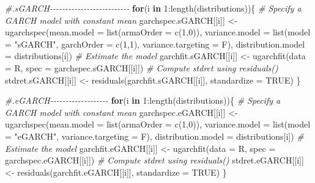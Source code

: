 \documentclass[a4paper, twoside]{templates/ociamthesis}
\newenvironment{Shaded}{\begin{snugshade}}{\end{snugshade}}
\newcommand{\AttributeTok}[1]{\textcolor[rgb]{0.77,0.63,0.00}{#1}}
\newcommand{\CommentTok}[1]{\textcolor[rgb]{0.56,0.35,0.01}{\textit{#1}}}
\newcommand{\ConstantTok}[1]{\textcolor[rgb]{0.00,0.00,0.00}{#1}}
\newcommand{\ControlFlowTok}[1]{\textcolor[rgb]{0.13,0.29,0.53}{\textbf{#1}}}
\newcommand{\DecValTok}[1]{\textcolor[rgb]{0.00,0.00,0.81}{#1}}
\newcommand{\FunctionTok}[1]{\textcolor[rgb]{0.00,0.00,0.00}{#1}}
\newcommand{\NormalTok}[1]{#1}
\newcommand{\OtherTok}[1]{\textcolor[rgb]{0.56,0.35,0.01}{#1}}
\newcommand{\SpecialCharTok}[1]{\textcolor[rgb]{0.00,0.00,0.00}{#1}}
\newcommand{\StringTok}[1]{\textcolor[rgb]{0.31,0.60,0.02}{#1}}
\renewenvironment{Shaded}
{
  \vspace{10pt}%
  \begin{snugshade}%
}{%
  \end{snugshade}%
  \vspace{8pt}%
}
\begin{document}
\begin{Shaded}
\begin{Highlighting}[]
\CommentTok{\#.sGARCH{-}{-}{-}{-}{-}{-}{-}{-}{-}{-}{-}{-}{-}{-}{-}{-}{-}{-}{-}{-}{-}{-}{-}{-}{-}{-}}
\ControlFlowTok{for}\NormalTok{(i }\ControlFlowTok{in} \DecValTok{1}\SpecialCharTok{:}\FunctionTok{length}\NormalTok{(distributions))\{}
\CommentTok{\# Specify a GARCH model with constant mean}
\NormalTok{garchspec.sGARCH[[i]] }\OtherTok{\textless{}{-}} \FunctionTok{ugarchspec}\NormalTok{(}\AttributeTok{mean.model =} \FunctionTok{list}\NormalTok{(}\AttributeTok{armaOrder =} \FunctionTok{c}\NormalTok{(}\DecValTok{1}\NormalTok{,}\DecValTok{0}\NormalTok{)),}
                     \AttributeTok{variance.model =} \FunctionTok{list}\NormalTok{(}\AttributeTok{model =} \StringTok{"sGARCH"}\NormalTok{, }\AttributeTok{garchOrder =} \FunctionTok{c}\NormalTok{(}\DecValTok{1}\NormalTok{,}\DecValTok{1}\NormalTok{), }\AttributeTok{variance.targeting =}\NormalTok{ F), }
                     \AttributeTok{distribution.model =}\NormalTok{ distributions[i])}
\CommentTok{\# Estimate the model}
\NormalTok{garchfit.sGARCH[[i]] }\OtherTok{\textless{}{-}} \FunctionTok{ugarchfit}\NormalTok{(}\AttributeTok{data =}\NormalTok{ R, }\AttributeTok{spec =}\NormalTok{ garchspec.sGARCH[[i]])}
\CommentTok{\# Compute stdret using residuals()}
\NormalTok{stdret.sGARCH[[i]] }\OtherTok{\textless{}{-}} \FunctionTok{residuals}\NormalTok{(garchfit.sGARCH[[i]], }\AttributeTok{standardize =} \ConstantTok{TRUE}\NormalTok{)}
\NormalTok{\}}

\CommentTok{\#.eGARCH{-}{-}{-}{-}{-}{-}{-}{-}{-}{-}{-}{-}{-}{-}{-}{-}{-}{-}{-}}
\ControlFlowTok{for}\NormalTok{(i }\ControlFlowTok{in} \DecValTok{1}\SpecialCharTok{:}\FunctionTok{length}\NormalTok{(distributions))\{}
\CommentTok{\# Specify a GARCH model with constant mean}
\NormalTok{garchspec.eGARCH[[i]] }\OtherTok{\textless{}{-}} \FunctionTok{ugarchspec}\NormalTok{(}\AttributeTok{mean.model =} \FunctionTok{list}\NormalTok{(}\AttributeTok{armaOrder =} \FunctionTok{c}\NormalTok{(}\DecValTok{1}\NormalTok{,}\DecValTok{0}\NormalTok{)),}
                     \AttributeTok{variance.model =} \FunctionTok{list}\NormalTok{(}\AttributeTok{model =} \StringTok{"eGARCH"}\NormalTok{, }\AttributeTok{variance.targeting =}\NormalTok{ F), }
                     \AttributeTok{distribution.model =}\NormalTok{ distributions[i])}
\CommentTok{\# Estimate the model}
\NormalTok{garchfit.eGARCH[[i]] }\OtherTok{\textless{}{-}} \FunctionTok{ugarchfit}\NormalTok{(}\AttributeTok{data =}\NormalTok{ R, }\AttributeTok{spec =}\NormalTok{ garchspec.eGARCH[[i]])}
\CommentTok{\# Compute stdret using residuals()}
\NormalTok{stdret.eGARCH[[i]] }\OtherTok{\textless{}{-}} \FunctionTok{residuals}\NormalTok{(garchfit.eGARCH[[i]], }\AttributeTok{standardize =} \ConstantTok{TRUE}\NormalTok{)}
\NormalTok{\}}


\end{Highlighting}
\end{Shaded}
\end{document}
